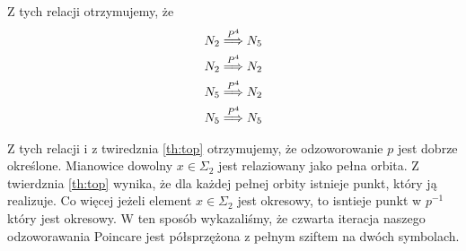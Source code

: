   Z tych relacji otrzymujemy, że 
\begin{eqnarray*}
  N_2 \stackrel{ P^4 }{\Longrightarrow} N_5 \\
  N_2 \stackrel{ P^4 }{\Longrightarrow} N_2 \\
  N_5 \stackrel{ P^4 }{\Longrightarrow} N_2 \\
  N_5 \stackrel{ P^4 }{\Longrightarrow} N_5 \\
\end{eqnarray*}

Z tych relacji i z twiredznia \ref{th:top} otrzymujemy, że odzoworowanie $ p $ jest dobrze określone. Mianowice dowolny $ x \in \Sigma_2 $ 
jest relaziowany jako pełna orbita. Z twierdznia \ref{th:top} wynika, że dla każdej pełnej orbity istnieje punkt, który ją realizuje. Co więcej
jeżeli element $ x \in \Sigma_2 $ jest okresowy, to isntieje punkt w $ p^{-1} $ który jest okresowy. 
W ten sposób wykazaliśmy, że czwarta iteracja naszego odzoworawania Poincare jest półsprzężona z pełnym sziftem na dwóch symbolach.














